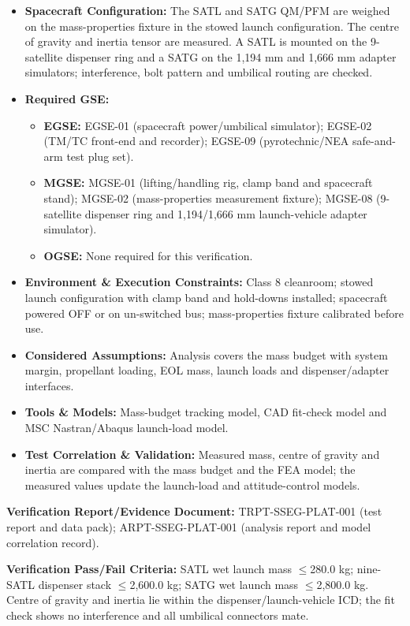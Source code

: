 \begin{itemize}
\item \textbf{Spacecraft Configuration:} The SATL and SATG QM/PFM are weighed on the mass-properties fixture in the stowed launch configuration. The centre of gravity and inertia tensor are measured. A SATL is mounted on the 9-satellite dispenser ring and a SATG on the 1,194 mm and 1,666 mm adapter simulators; interference, bolt pattern and umbilical routing are checked.
\item \textbf{Required GSE:}
\begin{itemize}
\item \textbf{EGSE:} EGSE-01 (spacecraft power/umbilical simulator); EGSE-02 (TM/TC front-end and recorder); EGSE-09 (pyrotechnic/NEA safe-and-arm test plug set).
\item \textbf{MGSE:} MGSE-01 (lifting/handling rig, clamp band and spacecraft stand); MGSE-02 (mass-properties measurement fixture); MGSE-08 (9-satellite dispenser ring and 1,194/1,666 mm launch-vehicle adapter simulator).
\item \textbf{OGSE:} None required for this verification.
\end{itemize}
\item \textbf{Environment \& Execution Constraints:} Class 8 cleanroom; stowed launch configuration with clamp band and hold-downs installed; spacecraft powered OFF or on un-switched bus; mass-properties fixture calibrated before use.
\item \textbf{Considered Assumptions:} Analysis covers the mass budget with system margin, propellant loading, EOL mass, launch loads and dispenser/adapter interfaces.
\item \textbf{Tools \& Models:} Mass-budget tracking model, CAD fit-check model and MSC Nastran/Abaqus launch-load model.
\item \textbf{Test Correlation \& Validation:} Measured mass, centre of gravity and inertia are compared with the mass budget and the FEA model; the measured values update the launch-load and attitude-control models.
\end{itemize}
\par\textbf{Verification Report/Evidence Document:} TRPT-SSEG-PLAT-001 (test report and data pack); ARPT-SSEG-PLAT-001 (analysis report and model correlation record).
\par\textbf{Verification Pass/Fail Criteria:} SATL wet launch mass $\le$280.0 kg; nine-SATL dispenser stack $\le$2,600.0 kg; SATG wet launch mass $\le$2,800.0 kg. Centre of gravity and inertia lie within the dispenser/launch-vehicle ICD; the fit check shows no interference and all umbilical connectors mate.
\par\medskip
